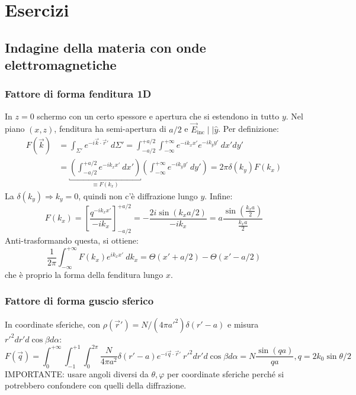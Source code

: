 \documentclass[10pt, a4paper]{scrartcl}
\numberwithin{equation}{subsection}
\theoremstyle{style1}
\begin{document}
\newpage
\section{Esercizi}

\subsection{Indagine della materia con onde elettromagnetiche}
\subsubsection{Fattore di forma fenditura 1D}
In $z=0$ schermo con un certo spessore e apertura che si estendono in tutto $y$. Nel piano $(x,z)$, fenditura ha semi-apertura di $a / 2$ e $\vec{E}_\text{inc} \mid  \mid \hat{y}$. Per definizione:
\begin{equation}
	\begin{split}
		F(\vec{k}) &= \int_{\Sigma'} e^{-i \vec{k}\cdot \vec{r}'} \ d\Sigma ' = \int_{-a / 2}^{+ a / 2}  \int_{-\infty} ^{+\infty} e^{-ik_x x'} e^{-ik_y y'}  \ dx' dy'\\
			   &= \underbracket{\left(\int_{- a / 2}^{+a / 2}  e^{-i k_x x'} \ dx'\right)}_{\equiv F(k_x)}  \left(\int_{-\infty} ^{+\infty} e^{-ik_y y'}  \ dy'\right) = 2\pi \delta (k_y)F(k_x)
	\end{split}
\end{equation}
La $\delta (k_y) \Rightarrow k_y=0$, quindi non c'\`e diffrazione lungo $y$. Infine:
\begin{equation}
	F(k_x) = \left[ \frac{q^{-ik_x x'} }{-ik_x} \right] ^{+ a / 2} _{- a /2}  = -\frac{2i \sin(k_x a / 2)}{- i k_x}= a\frac{\sin\left(\frac{k_x a }{2}\right) }{\frac{k_x a }{2}}
\end{equation}
Anti-trasformando questa, si ottiene:
\begin{equation}
	\frac{1}{2\pi} \int_{-\infty} ^{+\infty} F(k_x) e^{ik_x x'} \ dk_x= \Theta(x'+ a / 2) - \Theta (x' - a/2)
\end{equation}
che \`e proprio la forma della fenditura lungo $x$.

\subsubsection{Fattore di forma guscio sferico}

In coordinate sferiche, con $\rho (\vec{r}') = N / (4\pi a'^2) \delta(r'-a) $ e misura $r'^2 dr'd\cos \beta d\alpha $:
\begin{equation*}
	F(\vec{q}) = \int_{0} ^{+\infty} \int_{-1} ^{+1} \int_{0} ^{2\pi} \frac{N}{4\pi a^2}\delta (r' -a) e^{-i\vec{q}\cdot \vec{r}'} \ r'^2 dr' d\cos \beta  d\alpha = N \frac{\sin (qa)}{qa}, q = 2k_0 \sin \theta / 2
\end{equation*}
IMPORTANTE: usare angoli diversi da $\theta ,\varphi $ per coordinate sferiche perch\'e si potrebbero confondere con quelli della diffrazione.
\end{document}
